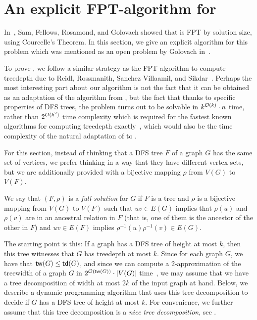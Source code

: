 \documentclass[a4paper,11pt]{article}
\begin{document}
\section{An explicit FPT-algorithm for \MinHProb} \label{sectn:faster-MinLT-fpt-algo}
%

In~\cite{SamFRG23},
Sam, Fellows, Rosamond, and Golovach showed that \MinHProb is FPT by solution size,
using Courcelle's Theorem.
In this section, we give an explicit algorithm for this problem 
which was mentioned as an open problem by Golovach in~\cite{DagstuhlDrawing}.

\thmMinHProb*

To prove , 
we follow a similar strategy as the FPT-algorithm to compute treedepth due to 
Reidl, Rossmanith, Sanchez Villaamil, and Sikdar~\cite{Reidl14}. Perhaps the most interesting part about our algorithm is not the fact that it can be obtained as an adaptation of the algorithm from \cite{Reidl14}, but the fact that thanks to specific properties of DFS trees, the \MinHProb problem turns out to be solvable in $k^{{\mathcal{O}}(k)} \cdot n$ time, rather than $2^{{\mathcal{O}}(k^2)}$ time complexity which is required for the fastest known algorithms for computing treedepth exactly~\cite{Reidl14,Nadara22}, which would also be the time complexity of the natural adaptation of \cite{Reidl14} to \MinHProb.
%

For this section, instead of thinking that a DFS tree $F$ of a graph $G$ has the same set of vertices, we prefer thinking in a way that they have different vertex sets, but we are additionally provided with a bijective mapping $\rho$ from $V(G)$ to $V(F)$.

\begin{definition} \label{def:full-solution}
We say that $(F, \rho)$ is a \emph{full solution} for $G$ if $F$ is a tree and $\rho$ is a bijective mapping from $V(G)$ to $V(F)$ such that $uv \in E(G)$ implies that $\rho(u)$ and $\rho(v)$ are in an ancestral relation in $F$ (that is, one of them is the ancestor of the other in $F$) and $uv \in E(F)$ implies $\rho^{-1}(u) \rho^{-1}(v) \in E(G)$.
\end{definition}

The starting point is this:
%
If a graph has a DFS tree of height at most $k$,
then this tree witnesses that 
$G$ has treedepth at most $k$.
Since for each graph $G$, we have that
$\mathsf{tw}(G) \le \mathsf{td}(G)$,
and since 
we can compute a $2$-approximation of the treewidth of a graph $G$ in $2^{{\mathcal{O}}(\mathsf{tw}(G))}\cdot |V(G)|$ time~\cite{Korhonen21},
we may assume that we have a tree decomposition of width at most $2k$ of the input graph at hand.
%
Below, we describe a dynamic programming algorithm that uses this tree decomposition to decide if $G$ has a DFS tree of height at most $k$.
For convenience, we further assume that this tree decomposition is a \emph{nice tree decomposition}, see .
\end{document}

